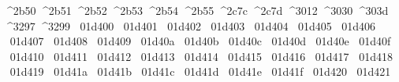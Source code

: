 {  ^^^^2b50%
  ^^^^2b51%
  ^^^^2b52%
  ^^^^2b53%
  ^^^^2b54%
  ^^^^2b55%
  ^^^^2c7c%
  ^^^^2c7d%
  ^^^^3012%
  ^^^^3030%
  ^^^^303d%
  ^^^^3297%
  ^^^^3299%
  ^^^^^^01d400%
  ^^^^^^01d401%
  ^^^^^^01d402%
  ^^^^^^01d403%
  ^^^^^^01d404%
  ^^^^^^01d405%
  ^^^^^^01d406%
  ^^^^^^01d407%
  ^^^^^^01d408%
  ^^^^^^01d409%
  ^^^^^^01d40a%
  ^^^^^^01d40b%
  ^^^^^^01d40c%
  ^^^^^^01d40d%
  ^^^^^^01d40e%
  ^^^^^^01d40f%
  ^^^^^^01d410%
  ^^^^^^01d411%
  ^^^^^^01d412%
  ^^^^^^01d413%
  ^^^^^^01d414%
  ^^^^^^01d415%
  ^^^^^^01d416%
  ^^^^^^01d417%
  ^^^^^^01d418%
  ^^^^^^01d419%
  ^^^^^^01d41a%
  ^^^^^^01d41b%
  ^^^^^^01d41c%
  ^^^^^^01d41d%
  ^^^^^^01d41e%
  ^^^^^^01d41f%
  ^^^^^^01d420%
  ^^^^^^01d421%
}
